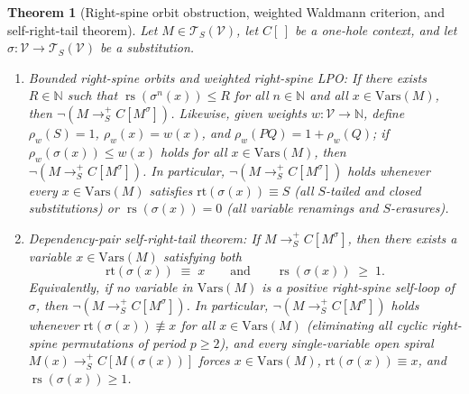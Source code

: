\documentclass[11pt,reqno]{amsart}
\numberwithin{equation}{section}
\theoremstyle{plain}
\newtheorem{theorem}{Theorem}[section]
\theoremstyle{definition}
\theoremstyle{remark}
\DeclareMathOperator{\rs}{rs}
\newcommand{\TSV}{\mathcal{T}_S(\mathcal{V})}
\newcommand{\redSp}{\to_S^+}
\begin{document}
\begin{theorem}[Right-spine orbit obstruction, weighted Waldmann criterion, and self-right-tail theorem]\label{thm:conj17-dp-weighted}
Let $M \in \TSV$, let $C[\,]$ be a one-hole context, and let $\sigma \colon \mathcal{V} \to \TSV$ be a substitution.
\begin{enumerate}[label=(\roman*),leftmargin=2.2em]
  \item \emph{Bounded right-spine orbits and weighted right-spine LPO:} If there exists $R \in \mathbb{N}$ such that $\rs(\sigma^n(x)) \le R$ for all $n \in \mathbb{N}$ and all $x \in \mathrm{Vars}(M)$, then $\neg(M \redSp C[M^\sigma])$. Likewise, given weights $w \colon \mathcal{V} \to \mathbb{N}$, define $\rho_w(S) = 1$, $\rho_w(x) = w(x)$, and $\rho_w(P Q) = 1 + \rho_w(Q)$; if $\rho_w(\sigma(x)) \le w(x)$ holds for all $x \in \mathrm{Vars}(M)$, then $\neg(M \redSp C[M^\sigma])$. In particular, $\neg(M \redSp C[M^\sigma])$ holds whenever every $x \in \mathrm{Vars}(M)$ satisfies $\mathrm{rt}(\sigma(x)) \equiv S$ (all $S$-tailed and closed substitutions) or $\rs(\sigma(x)) = 0$ (all variable renamings and $S$-erasures).
  \item \emph{Dependency-pair self-right-tail theorem:} If $M \redSp C[M^\sigma]$, then there exists a variable $x \in \mathrm{Vars}(M)$ satisfying both
  \begin{equation}\label{eq:self-right-tail}
    \mathrm{rt}(\sigma(x)) \;\equiv\; x \qquad \text{and} \qquad \rs(\sigma(x)) \;\ge\; 1.
  \end{equation}
  Equivalently, if no variable in $\mathrm{Vars}(M)$ is a positive right-spine self-loop of $\sigma$, then $\neg(M \redSp C[M^\sigma])$. In particular, $\neg(M \redSp C[M^\sigma])$ holds whenever $\mathrm{rt}(\sigma(x)) \not\equiv x$ for all $x \in \mathrm{Vars}(M)$ (eliminating all cyclic right-spine permutations of period $p \ge 2$), and every single-variable open spiral $M(x) \redSp C[M(\sigma(x))]$ forces $x \in \mathrm{Vars}(M)$, $\mathrm{rt}(\sigma(x)) \equiv x$, and $\rs(\sigma(x)) \ge 1$.
\end{enumerate}
\end{theorem}
\end{document}
